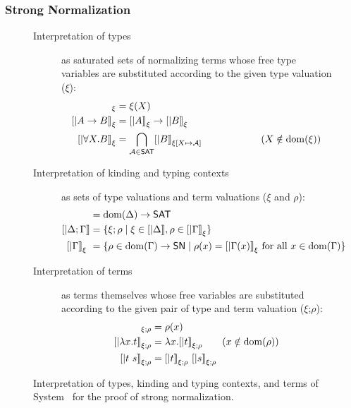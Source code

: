 \subsubsection*{Strong Normalization}
\begin{figure}
\begin{singlespace}
\begin{description}
\item[Interpretation of types] as saturated sets of normalizing terms
        whose free type variables are substituted according to
        the given type valuation ($\xi$):
\begin{align*}
[| X |]_\xi           &= \xi(X) \\ 
[| A -> B |]_\xi      &= [|A|]_\xi -> [|B|]_\xi \\
[| \forall X.B |]_\xi &= \bigcap_{\mathcal{A}\in\SAT} [|B|]_{\xi[X\mapsto\mathcal{A}]} \qquad\qquad\qquad (X\notin\dom(\xi))
\end{align*}
\item[Interpretation of kinding and typing contexts]
       as sets of type valuations and term valuations ($\xi$ and $\rho$):
\begin{align*}
[| \Delta        |] &= \dom(\Delta) -> \SAT \\
[| \Delta;\Gamma |] &= \{ \xi;\rho \mid \xi\in[|\Delta|], \rho\in[|\Gamma|]_\xi \} \\
[| \Gamma        |]_\xi\ &= \{ \rho \in \dom(\Gamma) -> \SN \mid \rho(x)=[|\Gamma(x)|]_\xi ~\text{for all}~x\in\dom(\Gamma) \}
\end{align*}
\item[Interpretation of terms]
        as terms themselves whose free variables are substituted according to
        the given pair of type and term valuation ($\xi$;$\rho$):
\begin{align*}
[| x      |]_{\xi;\rho} &= \rho(x) \\
[| \l x.t |]_{\xi;\rho} &= \l x . [|t|]_{\xi;\rho} \qquad (x\notin\dom(\rho)) \\
[| t ~ s  |]_{\xi;\rho} &= [| t |]_{\xi;\rho} ~ [| s |]_{\xi;\rho}
\end{align*}
\end{description}
\caption[Interpretation of System \F\ for proving strong normalization]
        {Interpretation of types, kinding and typing contexts, and terms
                of System \F\ for the proof of strong normalization.}
\label{fig:interpF}
\end{singlespace}
\end{figure}

